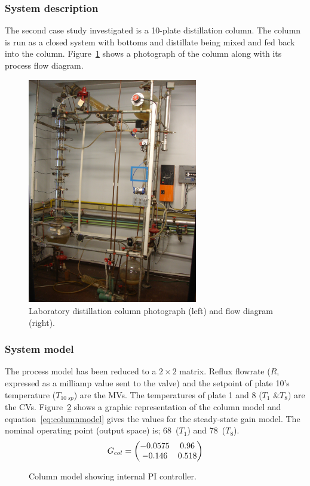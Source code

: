 \subsubsection{System description}
The second case study investigated is a 10-plate distillation column.
The column is run as a closed system with bottoms and distillate being mixed and fed back into the column.
Figure~\ref{fig:columnphoto} shows a photograph of the column along with its process flow diagram.
\begin{figure}[htbp]
  \centering
    \includegraphics[width=7.4cm]{graph/columnphoto.jpg}
    \scalebox{1}{}  
  \caption[Laboratory distillation column photograph and flow diagram]{Laboratory distillation column photograph (left) and flow diagram (right).}
  \label{fig:columnphoto}
\end{figure}

\subsubsection{System model}
The process model has been reduced to a $2\times2$ matrix.
Reflux flowrate ($R$, expressed as a milliamp value sent to the valve) and the setpoint of plate 10's temperature ($T_{10~sp}$) are the MVs.
The temperatures of plate 1 and 8 ($T_1\text{ \& }T_{8}$) are the CVs.
Figure~\ref{fig:columnmodel} shows a graphic representation of the column model and equation~\ref{eq:columnmodel} gives the values for the steady-state gain model.
The nominal operating point (output space) is; 68~\textcelsius ($T_1$) and 78~\textcelsius ($T_8$).
\begin{equation}
  \label{eq:columnmodel}
  G_{col} = \bpm -0.0575 & 0.96 \\       %
                -0.146  & 0.518 \\ \epm %
\end{equation}
\begin{figure}[htbp]
  \centering
    \scalebox{1}{}  
  \caption[Column model]{Column model showing internal PI controller.}
  \label{fig:columnmodel}
\end{figure}

